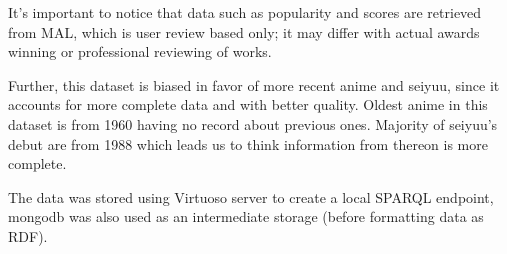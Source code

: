 It's important to notice that data such as popularity and scores are retrieved from MAL, which is user review based only; it may differ with actual awards winning or professional reviewing of works.

Further, this dataset is biased in favor of more recent anime and seiyuu, since it accounts for more complete data and with better quality. Oldest anime in this dataset is from 1960 having no record about previous ones. Majority of seiyuu's debut are from 1988 which leads us to think information from thereon is more complete. 

The data was stored using Virtuoso server to create a local SPARQL endpoint, mongodb was also used as an intermediate storage (before formatting data as RDF).











